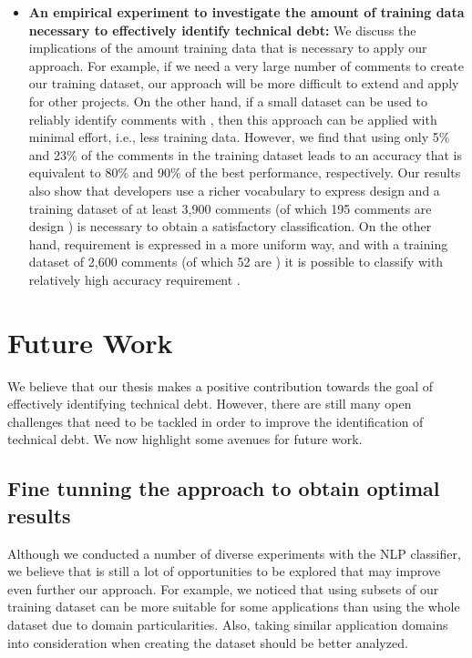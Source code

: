 \begin{itemize}
\item \textbf{An empirical experiment to investigate the amount of training data necessary to effectively identify technical debt:} We discuss the implications of the amount training data that is necessary to apply our approach. For example, if we need a very large number of comments to create our training dataset, our approach will be more difficult to extend and apply for other projects. On the other hand, if a small dataset can be used to reliably identify comments with \SATD, then this approach can be applied with minimal effort, i.e., less training data. However, we find that using only 5\% and 23\% of the comments in the training dataset leads to an accuracy that is equivalent to 80\% and 90\% of the best performance, respectively. Our results also show that developers use a richer vocabulary to express design \SATD and a training dataset of at least 3,900 comments (of which 195 comments are design \SATD) is necessary to obtain a satisfactory classification. On the other hand, requirement \SATD is expressed in a more uniform way, and with a training dataset of 2,600 comments (of which 52 are \SATD) it is possible to classify with relatively high accuracy requirement \SATD.

\end{itemize}

\section{Future Work}

We believe that our thesis makes a positive contribution towards the goal of effectively identifying technical debt. However, there are still many open challenges that need to be tackled in order to improve the identification of technical debt. We now highlight some avenues for future work.

\subsection{Fine tunning the approach to obtain optimal results}

Although we conducted a number of diverse experiments with the NLP classifier, we believe that is still a lot of opportunities to be explored that may improve even further our approach. For example, we noticed that using subsets of our training dataset can be more suitable for some applications than using the whole dataset due to domain particularities. Also, taking similar application domains into consideration when creating the dataset should be better analyzed.

